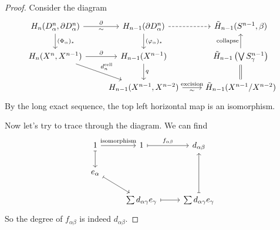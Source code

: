 \documentclass[a4paper]{article}
\begin{document}
\begin{proof}
  Consider the diagram
  \[
    \begin{tikzcd}
      H_n(D_\alpha^n, \partial D_\alpha^n) \ar[d, "(\Phi_\alpha)_*"] \ar[r, "\partial", "\sim"'] & H_{n - 1}(\partial D_\alpha^n)\ar[d, "(\varphi_\alpha)_*"] \ar[r, dashed] & \tilde{H}_{n - 1}(S^{n - 1}, \beta) \\
      H_n(X^n, X^{n - 1}) \ar[r, "\partial"] \ar[rd, "d_n^\mathrm{cell}"] & H_{n - 1}(X^{n - 1}) \ar[d, "q"] & \tilde{H}_{n - 1}\left(\bigvee S_\gamma^{n - 1}\right)\ar[u, "\text{collapse}"]\\
      & H_{n - 1}(X^{n - 1}, X^{n - 2}) \ar[r, "\text{excision}", "\sim"'] & \tilde{H}_{n - 1}(X^{n - 1}/X^{n - 2}) \ar[u, equals]
    \end{tikzcd}
  \]
  By the long exact sequence, the top left horizontal map is an isomorphism.

  Now let's try to trace through the diagram. We can find
  \[
    \begin{tikzcd}
      1 \ar[d, maps to] \ar[r, "\text{isomorphism}"] & 1 \ar[r, maps to, "f_{\alpha\beta}"]& d_{\alpha\beta}\\
      e_\alpha \ar[rd, maps to]\\
      & \sum d_{\alpha\gamma}e_\gamma \ar[r, maps to] & \sum d_{\alpha\gamma} e_\gamma \ar[uu, maps to]
    \end{tikzcd}
  \]
  So the degree of $f_{\alpha\beta}$ is indeed $d_{\alpha\beta}$.
\end{proof}
\end{document}

